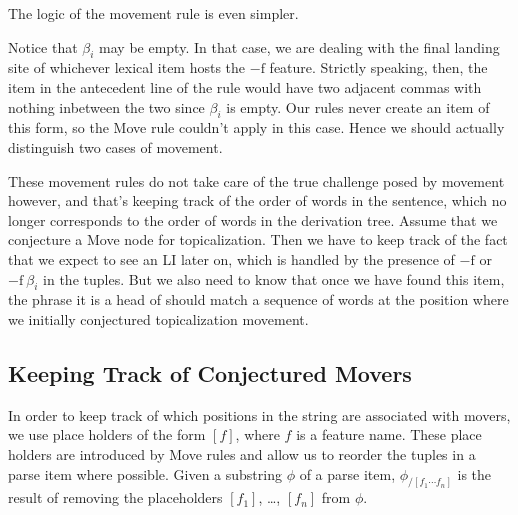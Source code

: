 The logic of the movement rule is even simpler.
%
\begin{prooftree}
\end{prooftree}
%
Notice that $\beta_i$ may be empty.
In that case, we are dealing with the final landing site of whichever lexical item hosts the $\mathrm{-f}$ feature.
Strictly speaking, then, the item in the antecedent line of the rule would have two adjacent commas with nothing inbetween the two since $\beta_i$ is empty.
Our rules never create an item of this form, so the Move rule couldn't apply in this case.
Hence we should actually distinguish two cases of movement.

\begin{prooftree}
\end{prooftree}
%
\begin{prooftree}
\end{prooftree}

These movement rules do not take care of the true challenge posed by movement however, and that's keeping track of the order of words in the sentence, which no longer corresponds to the order of words in the derivation tree.
Assume that we conjecture a Move node for topicalization.
Then we have to keep track of the fact that we expect to see an LI later on, which is handled by the presence of $\mathrm{-f}$ or $\mathrm{-f}\ \beta_i$ in the tuples.
But we also need to know that once we have found this item, the phrase it is a head of should match a sequence of words at the position where we initially conjectured topicalization movement.

\subsection{Keeping Track of Conjectured Movers}
\label{sub:MG-TopDown_MoveIndices}
In order to keep track of which positions in the string are associated with movers, we use place holders of the form $[f]$, where $f$ is a feature name.
These place holders are introduced by Move rules and allow us to reorder the tuples in a parse item where possible.
Given a substring $\phi$ of a parse item, $\phi_{/[f_1 \cdots f_n]}$ is the result of removing the placeholders $[f_1]$, \ldots, $[f_n]$ from $\phi$.

